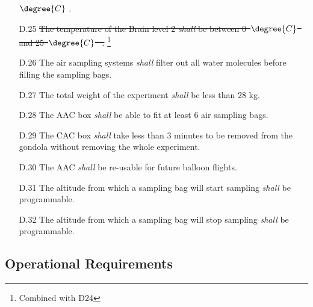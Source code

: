 \documentclass[a4paper,12pt,oneside]{article} %
\providecommand{\DIFaddbegin}{} %
\providecommand{\DIFaddend}{} %
\providecommand{\DIFdelbegin}{} %
\providecommand{\DIFdelend}{} %
\newcommand{\DIFscaledelfig}{0.5}
\newlength{\DIFdelgraphicswidth} %
\newlength{\DIFdelgraphicsheight} %
\newcommand{\DIFaddincludegraphics}[2][]{{\color{blue}\fbox{\DIFOincludegraphics[#1]{#2}}}} %
\newcommand{\DIFdelincludegraphics}[2][]{%
\sbox{\DIFdelgraphicsbox}{\DIFOincludegraphics[#1]{#2}}%
\settoboxwidth{\DIFdelgraphicswidth}{\DIFdelgraphicsbox} %
\settoboxtotalheight{\DIFdelgraphicsheight}{\DIFdelgraphicsbox} %
\scalebox{\DIFscaledelfig}{%
\parbox[b]{\DIFdelgraphicswidth}{\usebox{\DIFdelgraphicsbox}\\[-\baselineskip] \rule{\DIFdelgraphicswidth}{0em}}\llap{\resizebox{\DIFdelgraphicswidth}{\DIFdelgraphicsheight}{%
\setlength{\unitlength}{\DIFdelgraphicswidth}%
\begin{picture}(1,1)%
\thicklines\linethickness{2pt} %
{\color[rgb]{1,0,0}\put(0,0){\framebox(1,1){}}}%
{\color[rgb]{1,0,0}\put(0,0){\line( 1,1){1}}}%
{\color[rgb]{1,0,0}\put(0,1){\line(1,-1){1}}}%
\end{picture}%
}\hspace*{3pt}}} %
} %
\DeclareRobustCommand{\DIFaddbegin}{\DIFOaddbegin \let\includegraphics\DIFaddincludegraphics} %
\DeclareRobustCommand{\DIFaddend}{\DIFOaddend \let\includegraphics\DIFOincludegraphics} %
\DeclareRobustCommand{\DIFdelbegin}{\DIFOdelbegin \let\includegraphics\DIFdelincludegraphics} %
\DeclareRobustCommand{\DIFdelend}{\DIFOaddend \let\includegraphics\DIFOincludegraphics} %
\begin{document}
\begin{appendices}
\begin{enumerate}
{{$\degree{C}$
}%
}\DIFaddend .
    \item[D.25] \DIFdelbegin %
\DIFdelend \DIFaddbegin \st{The temperature of the Brain level 2 \textit{shall} be between 0\mbox{%
$\degree{C}$
}%
and 25\mbox{%
$\degree{C}$
}%
.} \DIFaddend \footnote{Combined with D24\label{fn:combi-d24}}
    \item[D.26] The air sampling systems \textit{shall} filter out all water molecules before filling the sampling bags.
    \item[D.27] The total weight of the experiment \textit{shall} be less than 28 kg.
    \item[D.28] The AAC box \textit{shall} be able to fit at least $6$ air sampling bags.
    \item[D.29] The CAC box \textit{shall} take less than 3 minutes to be removed from the gondola without removing the whole experiment.
    \item[D.30] The AAC \textit{shall} be re-usable for future balloon flights.
    \item[D.31] The altitude from which a sampling bag will start sampling \textit{shall} be programmable.
    \item[D.32] The altitude from which a sampling bag will stop sampling \textit{shall} be programmable.
\end{enumerate}

\pagebreak
\subsection{Operational Requirements}


\end{appendices}
\end{document}
